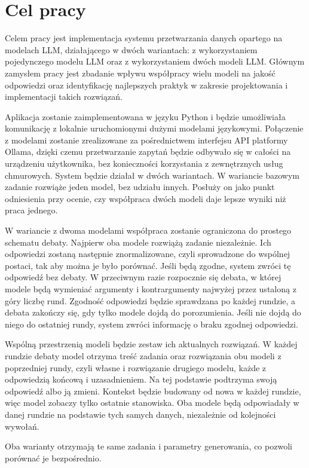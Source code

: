 \section{Cel pracy}

Celem pracy jest implementacja systemu przetwarzania danych opartego na modelach LLM, działającego w dwóch wariantach: z wykorzystaniem pojedynczego modelu LLM oraz z wykorzystaniem dwóch modeli LLM. Głównym zamysłem pracy jest zbadanie wpływu współpracy wielu modeli na jakość odpowiedzi oraz identyfikację najlepszych praktyk w zakresie projektowania i implementacji takich rozwiązań.

Aplikacja zostanie zaimplementowana w języku Python i będzie umożliwiała komunikację z lokalnie uruchomionymi dużymi modelami językowymi. Połączenie z modelami zostanie zrealizowane za pośrednictwem interfejsu API platformy Ollama, dzięki czemu przetwarzanie zapytań będzie odbywało się w całości na urządzeniu użytkownika, bez konieczności korzystania z zewnętrznych usług chmurowych. System będzie działał w dwóch wariantach. W wariancie bazowym zadanie rozwiąże jeden model, bez udziału innych. Posłuży on jako punkt odniesienia przy ocenie, czy współpraca dwóch modeli daje lepsze wyniki niż praca jednego.

W wariancie z dwoma modelami współpraca zostanie ograniczona do prostego schematu debaty. Najpierw oba modele rozwiążą zadanie niezależnie. Ich odpowiedzi zostaną następnie znormalizowane, czyli sprowadzone do wspólnej postaci, tak aby można je było porównać. Jeśli będą zgodne, system zwróci tę odpowiedź bez debaty. W przeciwnym razie rozpocznie się debata, w której modele będą wymieniać argumenty i kontrargumenty najwyżej przez ustaloną z góry liczbę rund. Zgodność odpowiedzi będzie sprawdzana po każdej rundzie, a debata zakończy się, gdy tylko modele dojdą do porozumienia. Jeśli nie dojdą do niego do ostatniej rundy, system zwróci informację o braku zgodnej odpowiedzi.

Wspólną przestrzenią modeli będzie zestaw ich aktualnych rozwiązań. W każdej rundzie debaty model otrzyma treść zadania oraz rozwiązania obu modeli z poprzedniej rundy, czyli własne i rozwiązanie drugiego modelu, każde z odpowiedzią końcową i uzasadnieniem. Na tej podstawie podtrzyma swoją odpowiedź albo ją zmieni. Kontekst będzie budowany od nowa w każdej rundzie, więc model zobaczy tylko ostatnie stanowiska. Oba modele będą odpowiadały w danej rundzie na podstawie tych samych danych, niezależnie od kolejności wywołań.

Oba warianty otrzymają te same zadania i parametry generowania, co pozwoli porównać je bezpośrednio.

